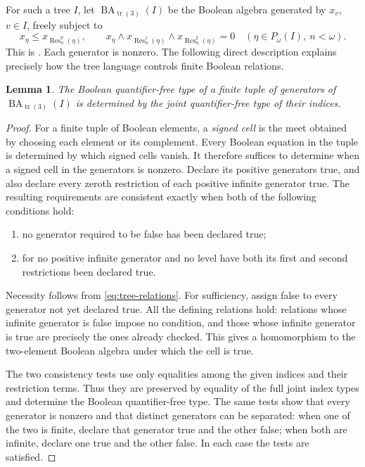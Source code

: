 \documentclass[11pt]{article}
\newtheorem{lemma}[theorem]{Lemma}
\theoremstyle{definition}
\theoremstyle{remark}
\newcommand{\Res}{\operatorname{Res}}
\newcommand{\BA}{\operatorname{BA}_{\operatorname{tr}(3)}}
\begin{document}
For such a tree $I$, let $\BA(I)$ be the Boolean algebra generated by
$x_v$, $v\in I$, freely subject to
\begin{equation}\label{eq:tree-relations}
 x_\eta\leq x_{\Res_n^0(\eta)},
 \qquad
 x_\eta\wedge x_{\Res_n^1(\eta)}\wedge x_{\Res_n^2(\eta)}=0
 \quad(\eta\in P_\omega(I),\ n<\omega).
\end{equation}
This is \cite[Definition~2.1(3)]{Shelah2026}.  Each generator is nonzero.
The following direct description explains precisely how the tree language
controls finite Boolean relations.

\begin{lemma}\label{lem:tree-relations}
The Boolean quantifier-free type of a finite tuple of generators of
$\BA(I)$ is determined by the joint quantifier-free type of their indices.
\end{lemma}

\begin{proof}
For a finite tuple of Boolean elements, a \emph{signed cell} is the meet
obtained by choosing each element or its complement.  Every Boolean equation
in the tuple is determined by which signed cells vanish.  It therefore
suffices to determine when a signed cell in the generators is nonzero.
Declare its positive
generators true, and also declare every zeroth restriction of each positive
infinite generator true.  The resulting requirements are consistent exactly
when both of the following conditions hold:
\begin{enumerate}
\item no generator required to be false has been declared true;
\item for no positive infinite generator and no level have both its first
      and second restrictions been declared true.
\end{enumerate}
Necessity follows from \eqref{eq:tree-relations}.  For sufficiency, assign
false to every generator not yet declared true.  All the defining relations
hold: relations whose infinite generator is false impose no condition, and
those whose infinite generator is true are precisely the ones already
checked.  This gives a homomorphism to the two-element Boolean algebra under
which the cell is true.

The two consistency tests use only equalities among the given indices and
their restriction terms.  Thus they are preserved by equality of the full
joint index types and determine the Boolean quantifier-free type.  The same
tests show that every generator is nonzero and that distinct generators
can be separated: when one of the two is finite, declare that generator
true and the other false; when both are infinite, declare one true and
the other false.  In each case the tests are satisfied.
\end{proof}
\end{document}
